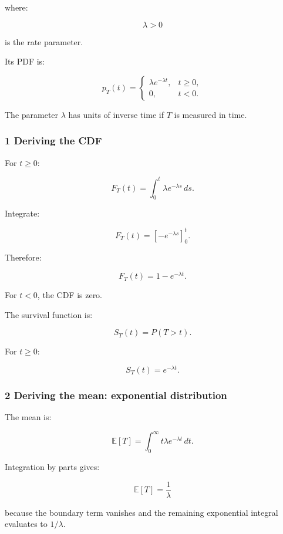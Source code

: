 where:

\[
 \lambda>0
\]

is the rate parameter.

Its PDF is:

\[
 \boxed{ p_T(t)= \begin{cases} \lambda e^{-\lambda t},&t\ge0,\\ 0,&t<0. \end{cases} }
\]

The parameter \(\lambda\) has units of inverse time if \(T\) is measured in time.

\subsubsection{1 Deriving the CDF}\label{02-foundations-ii-ch024-deriving-the-cdf}

\hypertarget{02-foundations-ii-ch024-deriving-the-cdf}{}

For \(t\ge0\):

\[
 F_T(t)= \int_0^t\lambda e^{-\lambda s}\,ds.
\]

Integrate:

\[
 F_T(t)= \left[-e^{-\lambda s}\right]_0^t.
\]

Therefore:

\[
 \boxed{ F_T(t)=1-e^{-\lambda t} }.
\]

For \(t<0\), the CDF is zero.

The survival function is:

\[
 S_T(t)=P(T>t).
\]

For \(t\ge0\):

\[
 \boxed{ S_T(t)=e^{-\lambda t} }.
\]

\subsubsection{2 Deriving the mean: exponential distribution}\label{02-foundations-ii-ch024-deriving-the-mean-exponential-distribution}

\hypertarget{02-foundations-ii-ch024-deriving-the-mean-exponential-distribution}{}

The mean is:

\[
 \mathbb E[T]= \int_0^\infty t\lambda e^{-\lambda t}\,dt.
\]

Integration by parts gives:

\[
 \mathbb E[T] = \frac1\lambda
\]

because the boundary term vanishes and the remaining exponential integral evaluates to \(1/\lambda\).

